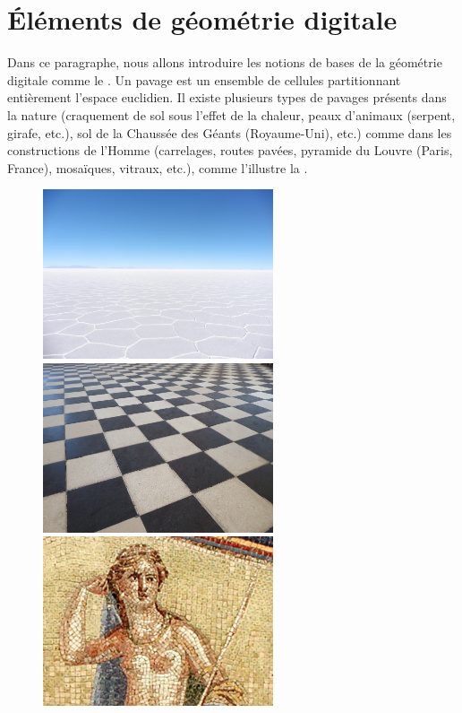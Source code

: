 \section{Éléments de géométrie digitale}
\label{sec:notions-base}
%
Dans ce paragraphe, nous allons introduire les notions de bases de la géométrie
digitale comme le . Un pavage est un ensemble de cellules
partitionnant entièrement l'espace euclidien. Il existe plusieurs types de
pavages présents dans la nature (craquement de sol sous l'effet de la chaleur,
peaux d'animaux (serpent, girafe, etc.), sol de la Chaussée des Géants
(Royaume-Uni), etc.) comme dans les constructions de l'Homme (carrelages, routes
pavées, pyramide du Louvre (Paris, France), mosaïques, vitraux, etc.), comme
l'illustre la .

\begin{figure}[ht]
  \begin{center}
    \includegraphics[width=6.8cm]{images/Notions/pavage_mer_de_sel}
    \includegraphics[width=6.8cm]{images/Notions/pavage_chateau}\\
    \includegraphics[width=6.8cm]{images/Notions/pavage_mosaique}

\end{center}
\end{figure}
